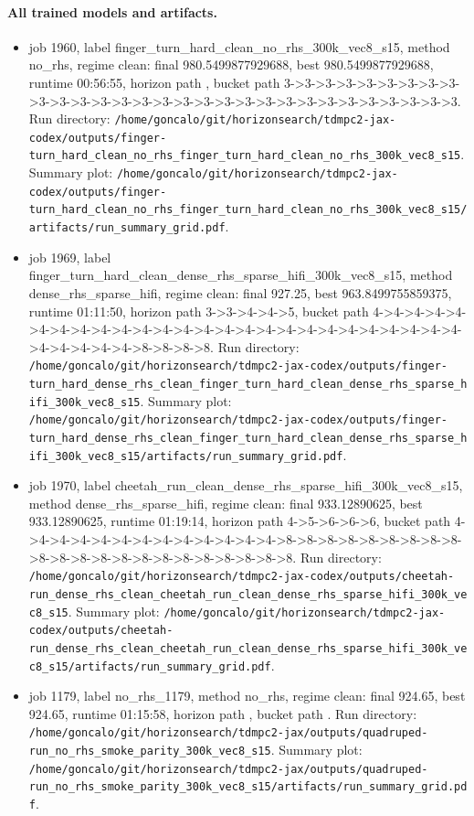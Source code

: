 \paragraph{All trained models and artifacts.}
\begin{itemize}
\item job 1960, label finger\_turn\_hard\_clean\_no\_rhs\_300k\_vec8\_s15, method no\_rhs, regime clean: final 980.5499877929688, best 980.5499877929688, runtime 00:56:55, horizon path , bucket path 3->3->3->3->3->3->3->3->3->3->3->3->3->3->3->3->3->3->3->3->3->3->3->3->3->3->3->3->3->3. Run directory: \texttt{/home/goncalo/git/horizonsearch/tdmpc2-jax-codex/outputs/finger-turn\_hard\_clean\_no\_rhs\_finger\_turn\_hard\_clean\_no\_rhs\_300k\_vec8\_s15}. Summary plot: \texttt{/home/goncalo/git/horizonsearch/tdmpc2-jax-codex/outputs/finger-turn\_hard\_clean\_no\_rhs\_finger\_turn\_hard\_clean\_no\_rhs\_300k\_vec8\_s15/artifacts/run\_summary\_grid.pdf}.
\item job 1969, label finger\_turn\_hard\_clean\_dense\_rhs\_sparse\_hifi\_300k\_vec8\_s15, method dense\_rhs\_sparse\_hifi, regime clean: final 927.25, best 963.8499755859375, runtime 01:11:50, horizon path 3->3->4->4->5, bucket path 4->4->4->4->4->4->4->4->4->4->4->4->4->4->4->4->4->4->4->4->4->4->4->4->4->4->4->4->4->4->4->8->8->8->8. Run directory: \texttt{/home/goncalo/git/horizonsearch/tdmpc2-jax-codex/outputs/finger-turn\_hard\_dense\_rhs\_clean\_finger\_turn\_hard\_clean\_dense\_rhs\_sparse\_hifi\_300k\_vec8\_s15}. Summary plot: \texttt{/home/goncalo/git/horizonsearch/tdmpc2-jax-codex/outputs/finger-turn\_hard\_dense\_rhs\_clean\_finger\_turn\_hard\_clean\_dense\_rhs\_sparse\_hifi\_300k\_vec8\_s15/artifacts/run\_summary\_grid.pdf}.
\item job 1970, label cheetah\_run\_clean\_dense\_rhs\_sparse\_hifi\_300k\_vec8\_s15, method dense\_rhs\_sparse\_hifi, regime clean: final 933.12890625, best 933.12890625, runtime 01:19:14, horizon path 4->5->6->6->6, bucket path 4->4->4->4->4->4->4->4->4->4->4->4->4->8->8->8->8->8->8->8->8->8->8->8->8->8->8->8->8->8->8->8->8->8->8. Run directory: \texttt{/home/goncalo/git/horizonsearch/tdmpc2-jax-codex/outputs/cheetah-run\_dense\_rhs\_clean\_cheetah\_run\_clean\_dense\_rhs\_sparse\_hifi\_300k\_vec8\_s15}. Summary plot: \texttt{/home/goncalo/git/horizonsearch/tdmpc2-jax-codex/outputs/cheetah-run\_dense\_rhs\_clean\_cheetah\_run\_clean\_dense\_rhs\_sparse\_hifi\_300k\_vec8\_s15/artifacts/run\_summary\_grid.pdf}.
\item job 1179, label no\_rhs\_1179, method no\_rhs, regime clean: final 924.65, best 924.65, runtime 01:15:58, horizon path , bucket path . Run directory: \texttt{/home/goncalo/git/horizonsearch/tdmpc2-jax/outputs/quadruped-run\_no\_rhs\_smoke\_parity\_300k\_vec8\_s15}. Summary plot: \texttt{/home/goncalo/git/horizonsearch/tdmpc2-jax/outputs/quadruped-run\_no\_rhs\_smoke\_parity\_300k\_vec8\_s15/artifacts/run\_summary\_grid.pdf}.

\end{itemize}
